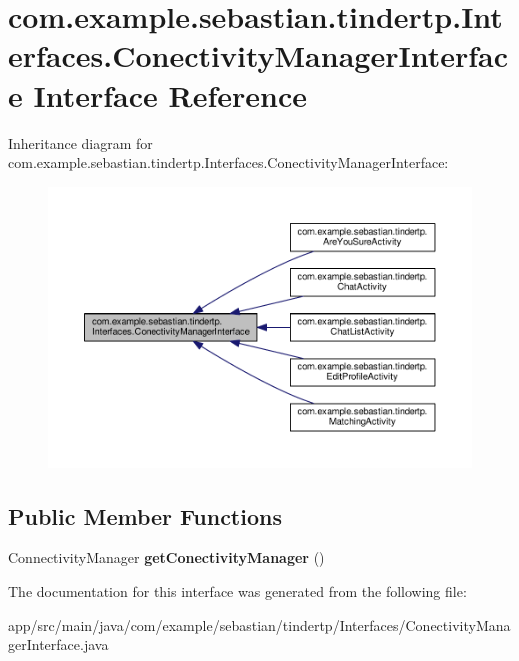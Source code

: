 \hypertarget{interfacecom_1_1example_1_1sebastian_1_1tindertp_1_1Interfaces_1_1ConectivityManagerInterface}{}\section{com.\+example.\+sebastian.\+tindertp.\+Interfaces.\+Conectivity\+Manager\+Interface Interface Reference}
\label{interfacecom_1_1example_1_1sebastian_1_1tindertp_1_1Interfaces_1_1ConectivityManagerInterface}


Inheritance diagram for com.\+example.\+sebastian.\+tindertp.\+Interfaces.\+Conectivity\+Manager\+Interface\+:\nopagebreak
\begin{figure}[H]
\begin{center}
\leavevmode
\includegraphics[width=350pt]{interfacecom_1_1example_1_1sebastian_1_1tindertp_1_1Interfaces_1_1ConectivityManagerInterface__inherit__graph}
\end{center}
\end{figure}
\subsection*{Public Member Functions}
\begin{DoxyCompactItemize}
\item 
Connectivity\+Manager {\bfseries get\+Conectivity\+Manager} ()\hypertarget{interfacecom_1_1example_1_1sebastian_1_1tindertp_1_1Interfaces_1_1ConectivityManagerInterface_ae3f301bef962e13c1076dccf965db06c}{}\label{interfacecom_1_1example_1_1sebastian_1_1tindertp_1_1Interfaces_1_1ConectivityManagerInterface_ae3f301bef962e13c1076dccf965db06c}

\end{DoxyCompactItemize}


The documentation for this interface was generated from the following file\+:\begin{DoxyCompactItemize}
\item 
app/src/main/java/com/example/sebastian/tindertp/\+Interfaces/Conectivity\+Manager\+Interface.\+java\end{DoxyCompactItemize}
